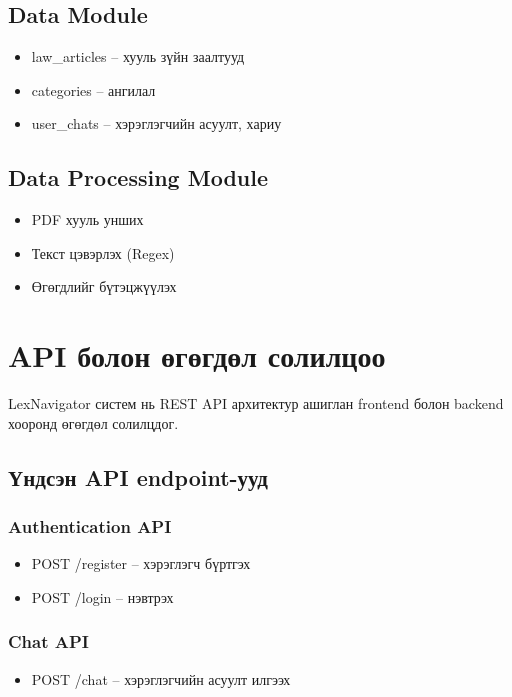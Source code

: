 \subsection{Data Module}

\begin{itemize}
    \item law\_articles -- хууль зүйн заалтууд
    \item categories -- ангилал
    \item user\_chats -- хэрэглэгчийн асуулт, хариу
\end{itemize}

\subsection{Data Processing Module}

\begin{itemize}
    \item PDF хууль унших
    \item Текст цэвэрлэх (Regex)
    \item Өгөгдлийг бүтэцжүүлэх
\end{itemize}


\section{API болон өгөгдөл солилцоо}

LexNavigator систем нь REST API архитектур ашиглан frontend болон backend хооронд өгөгдөл солилцдог.

\subsection{Үндсэн API endpoint-ууд}

\subsubsection{Authentication API}
\begin{itemize}
    \item POST /register -- хэрэглэгч бүртгэх
    \item POST /login -- нэвтрэх
\end{itemize}

\subsubsection{Chat API}
\begin{itemize}
    \item POST /chat -- хэрэглэгчийн асуулт илгээх
\end{itemize}

